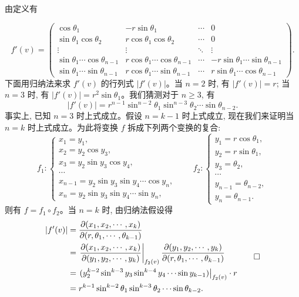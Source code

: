 \begin{solve}
由定义有

\[
  f'(v)=
  \begin{pmatrix}
    \cos\theta_1&-r\sin\theta_1&\cdots&0\\
    \sin\theta_1\cos\theta_2&r\cos\theta_1\cos\theta_2&\cdots&0\\
    \vdots&\vdots&\ddots&\vdots\\
    \sin\theta_1\cdots\cos\theta_{n-1}&r\cos\theta_1\cdots\cos\theta_{n-1}&\cdots&-r\sin\theta_1\cdots\sin\theta_{n-1}\\
    \sin\theta_1\cdots\sin\theta_{n-1}&r\cos\theta_1\cdots\sin\theta_{n-1}&\cdots&r\sin\theta_1\cdots\cos\theta_{n-1}
  \end{pmatrix}.
\]
下面用归纳法来求 $f'(v)$ 的行列式 $|f'(v)|$。当 $n=2$ 时, 有 $|f'(v)|=r$; 当 $n=3$ 时, 有 $|f'(v)|=r^2\sin\theta_1$。我们猜测对于 $n\geqslant3$, 有
\[
  |f'(v)|=r^{n-1}\sin^{n-2}\theta_1\sin^{n-3}\theta_2\cdots\sin\theta_{n-2}.
\]
事实上, 已知 $n=3$ 时上式成立。假设 $n=k-1$ 时上式成立, 现在我们来证明当 $n=k$ 时上式成立。为此将变换 $f$ 拆成下列两个变换的复合:
\[
  f_1:\begin{cases}
    x_1=y_1,\\
    x_2=y_2\cos y_3,\\
    x_3=y_2\sin y_3\cos y_4,\\
    \cdots\\
    x_{n-1}=y_2\sin y_3\sin y_4\cdots\cos y_n,\\
    x_n=y_2\sin y_3\sin y_4\cdots\sin y_n,
  \end{cases}
  \qquad
  f_2:\begin{cases}
    y_1=r\cos\theta_1,\\
    y_2=r\sin\theta_1,\\
    y_3=\theta_2,\\
    \cdots\\
    y_{n-1}=\theta_{n-2},\\
    y_n=\theta_{n-1}.
  \end{cases}
\]
则有 $f=f_1\circ f_2$。当 $n=k$ 时, 由归纳法假设得
\[
\begin{aligned}
  |f'(v)|
  &=
  \frac{\partial(x_1,x_2,\cdots,x_k)}
  {\partial(r,\theta_1,\cdots,\theta_{k-1})}\\
  &=
  \left.
  \frac{\partial(x_1,x_2,\cdots,x_k)}
  {\partial(y_1,y_2,\cdots,y_k)}
  \right|_{f_2(v)}
  \frac{\partial(y_1,y_2,\cdots,y_k)}
  {\partial(r,\theta_1,\cdots,\theta_{k-1})}\\
  &=
  \left.(y_2^{k-2}\sin^{k-3}y_3\sin^{k-4}y_4\cdots\sin y_{k-1})\right|_{f_2(v)}
  \cdot r\\
  &=r^{k-1}\sin^{k-2}\theta_1\sin^{k-3}\theta_2\cdots\sin\theta_{k-2}.
\end{aligned}
\qedhere
\]
\end{solve}


